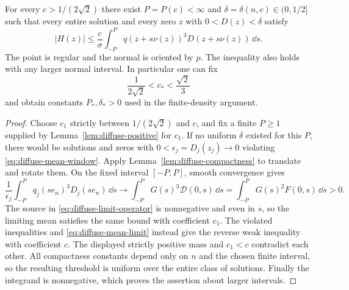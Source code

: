 \begin{lemma}
\label{lem:diffuse-mean}
For every $c>1/(2\sqrt2)$ there exist $P=P(c)<\infty$ and
$\delta=\delta(n,c)\in(0,1/2]$ such that every entire solution and every zero
$z$ with $0<D(z)<\delta$ satisfy
\begin{equation}\label{eq:diffuse-mean-window}
 |H(z)|\le\frac c\sigma
     \int_{-P}^P q(z+s\nu(z))^3D(z+s\nu(z))\,\dd s.
\end{equation}
The point is regular and the normal is oriented by $p$.
The inequality also holds with any larger normal interval.
In particular one can fix
\begin{equation}\label{eq:diffuse-strict-mean}
 \frac{1}{2\sqrt2}<c_*<\frac{\sqrt2}{3}
\end{equation}
and obtain constants $P_*,\delta_*>0$ used in the finite-density argument.
\end{lemma}

\begin{proof}
Choose $c_1$ strictly between $1/(2\sqrt2)$ and $c$, and fix a finite
$P\ge1$ supplied by Lemma~\ref{lem:diffuse-positive} for $c_1$.
If no uniform $\delta$ existed for this $P$, there would be solutions
and zeros with $0<\epsilon_j=D_j(z_j)\to0$ violating
\eqref{eq:diffuse-mean-window}. Apply
Lemma~\ref{lem:diffuse-compactness} to translate and rotate them.
On the fixed interval $[-P,P]$, smooth convergence gives
\[
 \frac1{\epsilon_j}\int_{-P}^P q_j(se_n)^3D_j(se_n)\,\dd s
 \longrightarrow\int_{-P}^P G(s)^3\mathcal D(0,s)\,\dd s
 =\int_{-P}^P G(s)^2F(0,s)\,\dd s>0.
\]
The source in \eqref{eq:diffuse-limit-operator} is nonnegative and even
in $s$, so the limiting mean satisfies the same bound with coefficient
$c_1$. The violated inequalities and
\eqref{eq:diffuse-mean-limit} instead give the reverse weak inequality
with coefficient $c$. The displayed strictly positive mass and
$c_1<c$ contradict each other. All compactness constants depend only on
$n$ and the chosen finite interval, so the resulting threshold is
uniform over the entire class of solutions. Finally the integrand is
nonnegative, which proves the assertion about larger intervals.
\end{proof}
